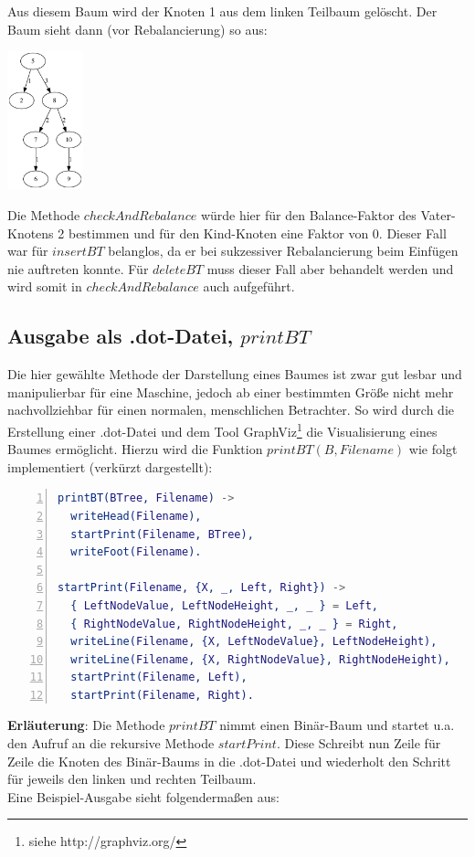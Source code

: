 \documentclass{article}
\begin{document}
	Aus diesem Baum wird der Knoten 1 aus dem linken Teilbaum gelöscht. Der Baum sieht dann (vor Rebalancierung) so aus:
	
	\begin{center}
   	\includegraphics[height=4cm]{4.png}
	\end{center}
	
	Die Methode $checkAndRebalance$ würde hier für den Balance-Faktor des Vater-Knotens 2 bestimmen und für den Kind-Knoten eine Faktor von 0. Dieser Fall war für $insertBT$ belanglos, da er bei sukzessiver Rebalancierung beim Einfügen nie auftreten konnte. Für $deleteBT$ muss dieser Fall aber behandelt werden und wird somit in $checkAndRebalance$ auch aufgeführt.
	
	\subsection{Ausgabe als .dot-Datei, $printBT$}
	
	Die hier gewählte Methode der Darstellung eines Baumes ist zwar gut lesbar und manipulierbar für eine Maschine, jedoch ab einer bestimmten Größe nicht mehr nachvollziehbar für einen normalen, menschlichen Betrachter. So wird durch die Erstellung einer .dot-Datei und dem Tool GraphViz\footnote{siehe http://graphviz.org/} die Visualisierung eines Baumes ermöglicht. Hierzu wird die Funktion $printBT(B, Filename)$ wie folgt implementiert (verkürzt dargestellt):
	
\begin{lstlisting}[language=erlang,numbers=left]
printBT(BTree, Filename) ->
  writeHead(Filename),
  startPrint(Filename, BTree),
  writeFoot(Filename).
  
startPrint(Filename, {X, _, Left, Right}) ->
  { LeftNodeValue, LeftNodeHeight, _, _ } = Left,
  { RightNodeValue, RightNodeHeight, _, _ } = Right,
  writeLine(Filename, {X, LeftNodeValue}, LeftNodeHeight),
  writeLine(Filename, {X, RightNodeValue}, RightNodeHeight),
  startPrint(Filename, Left),
  startPrint(Filename, Right).
\end{lstlisting}

	\textbf{Erläuterung}: Die Methode $printBT$ nimmt einen Binär-Baum und startet u.a. den Aufruf an die rekursive Methode $startPrint$.
	Diese Schreibt nun Zeile für Zeile die Knoten des Binär-Baums in die .dot-Datei und wiederholt den Schritt für jeweils den linken und rechten Teilbaum.\\Eine Beispiel-Ausgabe sieht folgendermaßen aus:
\end{document}
